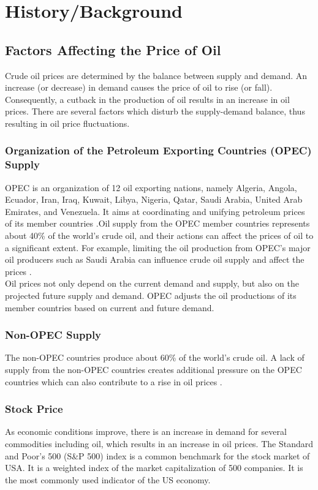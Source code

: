 \documentclass[runningheads]{llncs}
\begin{document}
\section{History/Background}
\subsection{Factors Affecting the Price of Oil}
Crude oil prices are determined by the balance between supply and demand. An increase (or decrease) in demand causes the price of oil to rise (or fall). Consequently, a cutback in the production of oil results in an increase in oil prices. There are several factors which disturb the supply-demand balance, thus resulting in oil price fluctuations. 

\subsubsection{Organization of the Petroleum Exporting Countries (OPEC) Supply}
OPEC is an organization of 12 oil exporting nations, namely Algeria, Angola, Ecuador, Iran, Iraq, Kuwait, Libya, Nigeria, Qatar, Saudi Arabia, United Arab Emirates, and Venezuela. It aims at coordinating and unifying petroleum prices of its member countries \cite{opec}.Oil supply from the OPEC member countries represents about 40\% of the world’s crude oil, and their actions can affect the prices of oil to a significant extent. For example, limiting the oil production from OPEC’s major oil producers such as Saudi Arabia can influence crude oil supply and affect the prices \cite{eiafactors}.\\ 
Oil prices not only depend on the current demand and supply, but also on the projected future supply and demand. OPEC adjusts the oil productions of its member countries based on current and future demand.

\subsubsection{Non-OPEC Supply}
The non-OPEC countries produce about 60\% of the world's crude oil. A lack of supply from the non-OPEC countries creates additional pressure on the OPEC countries which can also contribute to a rise in oil prices \cite{eiafactors}.

\subsubsection{Stock Price}
As economic conditions improve, there is an increase in demand for several commodities including oil, which results in an increase in oil prices. The Standard and Poor's 500 (S\&P 500) index is a common benchmark for the stock market of USA. It is a weighted index of the market capitalization of 500 companies. It is the most commonly used indicator of the US economy.
\end{document}
